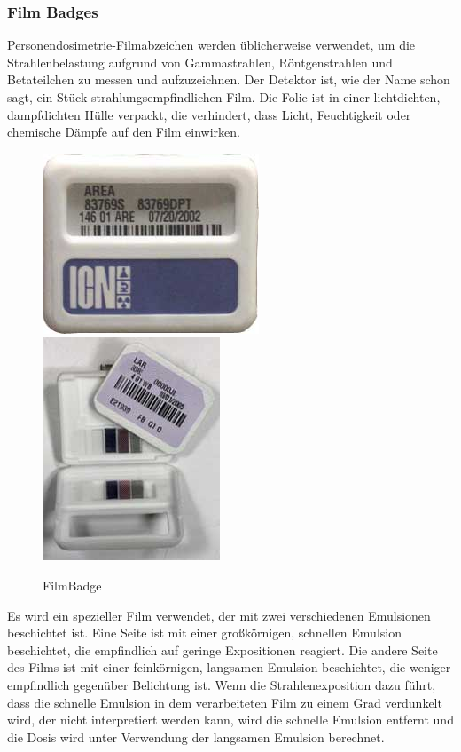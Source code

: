 {\subsubsection{Film Badges}
Personendosimetrie-Filmabzeichen werden üblicherweise verwendet, um die Strahlenbelastung aufgrund von Gammastrahlen, Röntgenstrahlen und Betateilchen zu messen und aufzuzeichnen. Der Detektor ist, wie der Name schon sagt, ein Stück strahlungsempfindlichen Film. Die Folie ist in einer lichtdichten, dampfdichten Hülle verpackt, die verhindert, dass Licht, Feuchtigkeit oder chemische Dämpfe auf den Film einwirken.
\begin{figure}[htb]
   \includegraphics[scale=0.7]{img/area-filmbadge.jpg}
   \includegraphics[scale=0.5]{img/FilmBadge.jpg}
  \caption{FilmBadge}
  \label{fig:FilmBadge}
\end{figure}
Es wird ein spezieller Film verwendet, der mit zwei verschiedenen Emulsionen beschichtet ist. Eine Seite ist mit einer großkörnigen, schnellen Emulsion beschichtet, die empfindlich auf geringe Expositionen reagiert. Die andere Seite des Films ist mit einer feinkörnigen, langsamen Emulsion beschichtet, die weniger empfindlich gegenüber Belichtung ist. Wenn die Strahlenexposition dazu führt, dass die schnelle Emulsion in dem verarbeiteten Film zu einem Grad verdunkelt wird, der nicht interpretiert werden kann, wird die schnelle Emulsion entfernt und die Dosis wird unter Verwendung der langsamen Emulsion berechnet.
}

